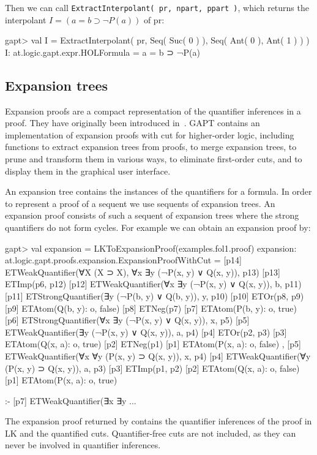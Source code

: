 \documentclass[a4paper,11pt]{article}
\newcommand{\impl}{\supset} %
\renewcommand{\lnot}{\neg}
\newcommand{\cli}[1]{{\ttfamily {#1}}}
\begin{document}
Then we can call \texttt{ExtractInterpolant( pr, npart, ppart )}, which returns the interpolant $I = (a=b \impl \lnot P(a))$ of pr:
\begin{clilisting}
gapt> val I = ExtractInterpolant( pr, Seq( Suc( 0 ) ), Seq( Ant( 0 ), Ant( 1 ) ) )
I: at.logic.gapt.expr.HOLFormula = a = b ⊃ ¬P(a)

\end{clilisting}

\subsection{Expansion trees}

Expansion proofs are a compact representation of the quantifier inferences in a
proof.  They have originally been introduced in~\cite{Miller87Compact}.  GAPT
contains an implementation of expansion proofs with cut for higher-order logic,
including functions to extract expansion trees from proofs, to merge expansion
trees, to prune and transform them in various ways, to eliminate first-order
cuts, and to display them in the graphical user interface.

An expansion tree contains the instances of the quantifiers for a formula.  In order
to represent a proof of a sequent we use sequents of expansion trees.  An
expansion proof consists of such a sequent of expansion trees where the
strong quantifiers do not form cycles.
For example we can obtain an expansion proof by:
\begin{clilisting}
gapt> val expansion = LKToExpansionProof(examples.fol1.proof)
expansion: at.logic.gapt.proofs.expansion.ExpansionProofWithCut =
[p14] ETWeakQuantifier(∀X (X ⊃ X), ∀x ∃y (¬P(x, y) ∨ Q(x, y)), p13)
[p13] ETImp(p6, p12)
[p12] ETWeakQuantifier(∀x ∃y (¬P(x, y) ∨ Q(x, y)), b, p11)
[p11] ETStrongQuantifier(∃y (¬P(b, y) ∨ Q(b, y)), y, p10)
[p10] ETOr(p8, p9)
[p9] ETAtom(Q(b, y): o, false)
[p8] ETNeg(p7)
[p7] ETAtom(P(b, y): o, true)
[p6] ETStrongQuantifier(∀x ∃y (¬P(x, y) ∨ Q(x, y)), x, p5)
[p5] ETWeakQuantifier(∃y (¬P(x, y) ∨ Q(x, y)), a, p4)
[p4] ETOr(p2, p3)
[p3] ETAtom(Q(x, a): o, true)
[p2] ETNeg(p1)
[p1] ETAtom(P(x, a): o, false)
,
[p5] ETWeakQuantifier(∀x ∀y (P(x, y) ⊃ Q(x, y)), x, p4)
[p4] ETWeakQuantifier(∀y (P(x, y) ⊃ Q(x, y)), a, p3)
[p3] ETImp(p1, p2)
[p2] ETAtom(Q(x, a): o, false)
[p1] ETAtom(P(x, a): o, true)

:-
[p7] ETWeakQuantifier(∃x ∃y ...
\end{clilisting}

The expansion proof returned by \cli{LKToExpansionProof} contains the
quantifier inferences of the proof in LK and the quantified cuts.
Quantifier-free cuts are not included, as they can never be involved in
quantifier inferences.
\end{document}
